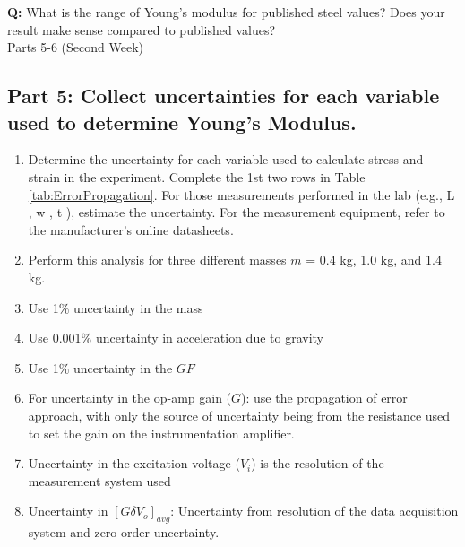 \documentclass{article} %
\begin{document}
\textbf{Q:} What is the range of Young's modulus for published steel values?  Does your result make sense compared to published values?\\

\clearpage
{\LARGE Parts 5-6 (Second Week)}

\subsection{Part 5: Collect uncertainties for each variable used to determine Young’s Modulus.}
\begin{enumerate}
    \item Determine the uncertainty for each variable used to calculate stress and strain in the experiment. Complete the 1st two rows in Table \ref{tab:ErrorPropagation}. For those measurements performed in the lab (e.g., L , w , t ), estimate the uncertainty. For the measurement equipment, refer to the manufacturer’s online datasheets.
    \item Perform this analysis for three different masses $m$ = 0.4 kg, 1.0 kg, and 1.4 kg.
    \item Use 1\% uncertainty in the mass
    \item Use 0.001\% uncertainty in acceleration due to gravity
    \item Use 1\% uncertainty in the $GF$
    \item For uncertainty in the op-amp gain ($G$): use the propagation of error approach, with only the source of uncertainty being from the resistance used to set the gain on the instrumentation amplifier.
    \item Uncertainty in the excitation voltage ($V_i$) is the resolution of the measurement system used
    \item Uncertainty in $[G \delta V_o]_{avg}$: Uncertainty from resolution of the data acquisition system and zero-order uncertainty.
\end{enumerate}
\end{document}
